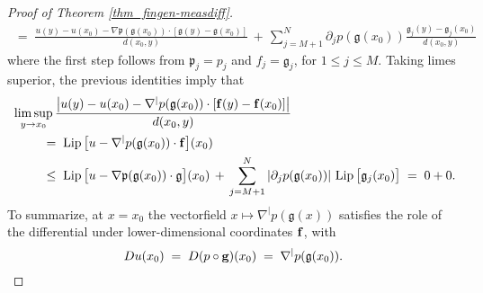 \documentclass[reqno]{amsart}
\theoremstyle{plain}
\theoremstyle{definition}
\theoremstyle{remark}
\numberwithin{equation}{section}
\newcommand{\g}{\mathfrak{g}}
\newcommand{\Lip}{\operatorname{Lip}}
\newcommand{\p}{\mathfrak{p}}
\begin{document}
\begin{proof}[Proof of Theorem \ref{thm_fingen-measdiff}]
\begin{equation*}
\begin{split}
\,=\;
\frac{u(y) - u(x_0) - \nabla\p(\g(x_0)) \cdot [\g(y) - \g(x_0)]}{d(x_0,y)} \,+\,
\sum_{j=M+1}^N \partial_jp(\g(x_0)) \frac{\g_j(y) - \g_j(x_0)}{d(x_0,y)}
\end{split}
\end{equation*}
where the first step follows from $\p_j = p_j$ and $f_j = \g_j$, for $1 \leq j \leq M$.
Taking limes superior, the previous identities imply that
\begin{equation*}
\begin{split}
&
\limsup_{y \to x_0} \frac{\big|u(y) - u(x_0) - \nabla^|p(\g(x_0)) \cdot [{\bf f}(y) - {\bf f}(x_0)]\big|}{d(x_0,y)} \\ &
\hspace{.3in} \;=\;
\Lip\big[u - \nabla^|p(\g(x_0)) \cdot {\bf f}\big](x_0) \\ &
\hspace{.3in} \;\leq\;
\Lip\big[u - \nabla\p(\g(x_0)) \cdot \g\big](x_0) \,+\,
\sum_{j=M+1}^N |\partial_jp(\g(x_0))| \, \Lip\big[\g_j(x_0)\big] \;=\; 0 + 0.
\end{split}
\end{equation*}
To summarize, at $x =x_0$  the vectorfield $x \mapsto \nabla^|p (\g(x))$ satisfies the role of the differential under lower-dimensional coordinates ${\bf f}$, with
$$
Du(x_0) \;=\;
D(p \circ {\bf g})(x_0) \;=\;
\nabla^|p (\g(x_0)).
$$


\end{proof}
\end{document}
